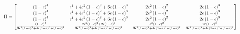 \documentclass[WP]{AEA}
\begin{document}

 \begin{equation*}
 	\resizebox{\textwidth}{!}{
$	\Pi = 
	\left[
		\begin{matrix}
			\left(1 - \epsilon\right)^{4} & \epsilon^{4} + 4 \epsilon^{2} \left(1 - \epsilon\right)^{2} + 6 \epsilon \left(1 - \epsilon\right)^{3} & 2 \epsilon^{2} \left(1 - \epsilon\right)^{2} & 2 \epsilon \left(1 - \epsilon\right)^{3}\\\left(1 - \epsilon\right)^{4} & \epsilon^{4} + 4 \epsilon^{2} \left(1 - \epsilon\right)^{2} + 6 \epsilon \left(1 - \epsilon\right)^{3} & 2 \epsilon^{2} \left(1 - \epsilon\right)^{2} & 2 \epsilon \left(1 - \epsilon\right)^{3}\\\left(1 - \epsilon\right)^{4} & \epsilon^{4} + 4 \epsilon^{2} \left(1 - \epsilon\right)^{2} + 6 \epsilon \left(1 - \epsilon\right)^{3} & 2 \epsilon^{2} \left(1 - \epsilon\right)^{2} & 2 \epsilon \left(1 - \epsilon\right)^{3}\\\frac{\left(1 - \epsilon\right)^{4}}{3 \epsilon^{2} \left(1 - \epsilon\right)^{2} + 4 \epsilon \left(1 - \epsilon\right)^{3} + \left(1 - \epsilon\right)^{4}} & \frac{2 \epsilon^{2} \left(1 - \epsilon\right)^{2} + 2 \epsilon \left(1 - \epsilon\right)^{3}}{3 \epsilon^{2} \left(1 - \epsilon\right)^{2} + 4 \epsilon \left(1 - \epsilon\right)^{3} + \left(1 - \epsilon\right)^{4}} & \frac{\epsilon^{2} \left(1 - \epsilon\right)^{2}}{3 \epsilon^{2} \left(1 - \epsilon\right)^{2} + 4 \epsilon \left(1 - \epsilon\right)^{3} + \left(1 - \epsilon\right)^{4}} & \frac{2 \epsilon \left(1 - \epsilon\right)^{3}}{3 \epsilon^{2} \left(1 - \epsilon\right)^{2} + 4 \epsilon \left(1 - \epsilon\right)^{3} + \left(1 - \epsilon\right)^{4}}
		\end{matrix}
	\right] 
	$
}
\end{equation*}
\end{document}

